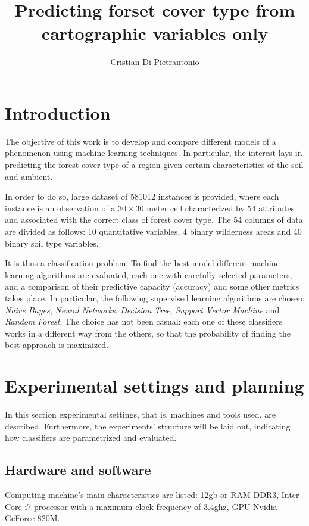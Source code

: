 \documentclass[a4paper, 10pt]{article}
\title{Predicting forset cover type from cartographic variables only}
\author{Cristian Di Pietrantonio}
\begin{document}
\maketitle
\begin{abstract}


\end{abstract}
\newpage
\tableofcontents
\newpage

\section{Introduction}

The objective of this work is to develop and compare different models of a phenomenon using machine learning techniques. In particular, the interest lays in predicting the forest cover type of a region given certain characteristics of the soil and ambient. 

In order to do so, large dataset of 581012 instances is provided, where each instance is an observation of a $30 \times 30$ meter cell characterized by 54 attributes and associated with the correct class of forest cover type. The 54 columns of data are divided as follows: 10 quantitative variables, 4 binary wilderness areas and 40 binary soil type variables.

It is thus a classification problem. To find the best model different machine learning algorithms are evaluated, each one with carefully selected parameters, and a comparison of their predictive capacity (accuracy) and some other metrics takes place. In particular, the following supervised learning algorithms are chosen: \emph{Naive Bayes}, \emph{Neural Networks}, \emph{Decision Tree}, \emph{Support Vector Machine} and \emph{Random Forest}. The choice has not been casual: each one of these classifiers works in a different way from the others, so that the probability of finding the best approach is maximized.

\section{Experimental settings and planning} 
In this section experimental settings, that is, machines and tools used, are described. Furthermore, the experiments' structure will be laid out, indicating how classifiers are parametrized and evaluated.
\subsection{Hardware and software}
 Computing machine's main characteristics are listed: 12gb or RAM DDR3, Inter Core i7 processor with a maximum clock frequency of 3.4ghz, GPU Nvidia GeForce 820M. 
\end{document}
